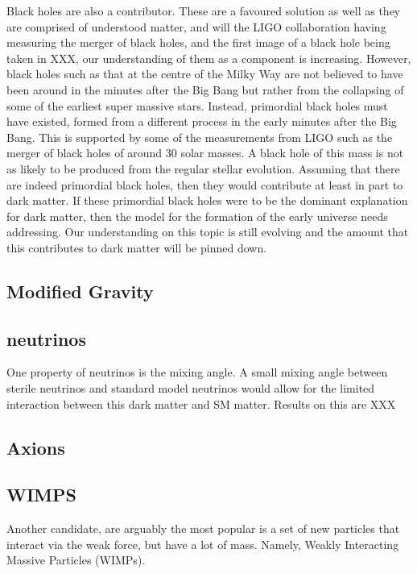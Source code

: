 \par
Black holes are also a contributor. 
These are a favoured solution as well as they are comprised of understood matter, and will the LIGO collaboration having measuring the merger of black holes, and the first image of a black hole being taken in XXX, our understanding of them as a component is increasing.
However, black holes such as that at the centre of the Milky Way are not believed to have been around in the minutes after the Big Bang but rather from the collapsing of some of the earliest super massive stars.
Instead, primordial black holes must have existed, formed from a different process in the early minutes after the Big Bang.
This is supported by some of the measurements from LIGO such as the merger of black holes of around 30 solar masses.
A black hole of this mass is not as likely to be produced from the regular stellar evolution.
Assuming that there are indeed primordial black holes, then they would contribute at least in part to dark matter.
If these primordial black holes were to be the dominant explanation for dark matter, then the model for the formation of the early universe needs addressing.
Our understanding on this topic is still evolving and the amount that this contributes to dark matter will be pinned down.

\subsection{Modified Gravity}
\par

\subsection{neutrinos}
\par
One property of neutrinos is the mixing angle.
A small mixing angle between sterile neutrinos and standard model neutrinos would allow for the limited interaction between this dark matter and SM matter.
Results on this are XXX

\subsection{Axions}
\par

\subsection{WIMPS}
\par
Another candidate, are arguably the most popular is a set of new particles that interact via the weak force, but have a lot of mass.
Namely, Weakly Interacting Massive Particles (WIMPs). 
